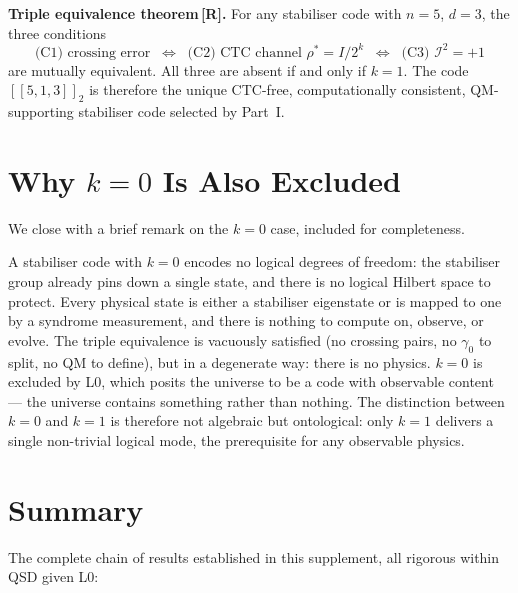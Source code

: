 \documentclass[11pt,a4paper]{article}
\newcommand{\Rmark}{\textcolor{green!50!black}{\textbf{[R]}}}
\newcommand{\Cq}[4]{[\![#1,#2,#3]\!]_{#4}}
\begin{document}
\begin{mdframed}[backgroundcolor=Rbg,linecolor=Rcolor,linewidth=2.2pt,
                 innerlinewidth=0.8pt, outerlinewidth=0.8pt,
                 middlelinewidth=1pt, middlelinecolor=Rcolor]
\textbf{Triple equivalence theorem\,\Rmark.}\quad
For any stabiliser code with $n=5$, $d=3$, the three conditions
\[
  \text{(C1) crossing error}\;\;\Longleftrightarrow\;\;
  \text{(C2) CTC channel } \rho^*=I/2^k \;\;\Longleftrightarrow\;\;
  \text{(C3) }\mathcal{I}^2=+1
\]
are mutually equivalent. All three are absent if and only if $k=1$. The code $\Cq{5}{1}{3}{2}$ is therefore the unique CTC-free, computationally consistent, QM-supporting stabiliser code selected by Part~I.
\end{mdframed}

\section{Why $k=0$ Is Also Excluded}
\label{sec:k0}

We close with a brief remark on the $k=0$ case, included for completeness.

A stabiliser code with $k=0$ encodes no logical degrees of freedom: the stabiliser group already pins down a single state, and there is no logical Hilbert space to protect. Every physical state is either a stabiliser eigenstate or is mapped to one by a syndrome measurement, and there is nothing to compute on, observe, or evolve. The triple equivalence is vacuously satisfied (no crossing pairs, no $\gamma_0$ to split, no QM to define), but in a degenerate way: there is no physics. $k=0$ is excluded by L0, which posits the universe to be a code with observable content --- the universe contains something rather than nothing. The distinction between $k=0$ and $k=1$ is therefore not algebraic but ontological: only $k=1$ delivers a single non-trivial logical mode, the prerequisite for any observable physics.

\section{Summary}
\label{sec:summary}

The complete chain of results established in this supplement, all rigorous within QSD given L0:
\end{document}
